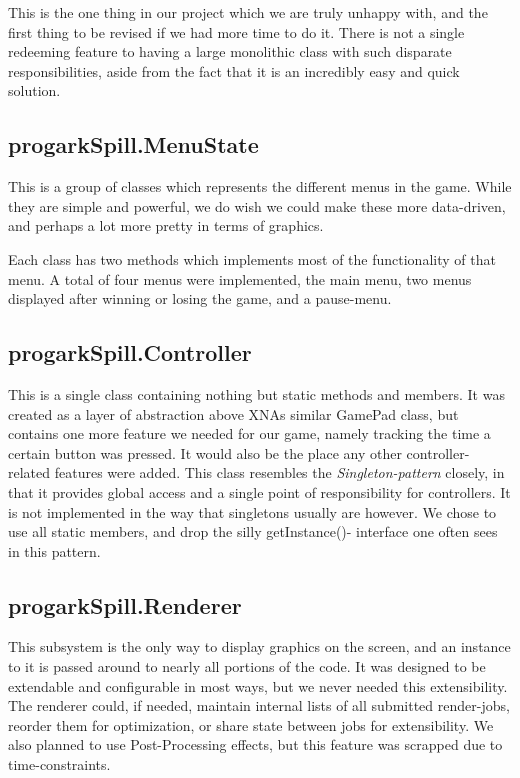 This is the one thing in our project which we are truly unhappy with, and the
first thing to be revised if we had more time to do it. There is not a single
redeeming feature to having a large monolithic class with such disparate
responsibilities, aside from the fact that it is an incredibly easy and quick
solution.

\subsection{progarkSpill.MenuState}
This is a group of classes which represents the different menus in the game.
While they are simple and powerful, we do wish we could make these more
data-driven, and perhaps a lot more pretty in terms of graphics.

Each class has two methods which implements most of the functionality of that
menu. A total of four menus were implemented, the main menu, two menus 
displayed  after winning or losing the game, and a pause-menu.

\subsection{progarkSpill.Controller}
This is a single class containing nothing but static methods and members. It
was created as a layer of abstraction above XNAs similar GamePad class, but
contains one more feature we needed for our game, namely tracking the time a
certain button was pressed. It would also be the place any other controller-
related features were added. This class resembles the \emph{Singleton-pattern}
closely, in that it provides global access and a single point of responsibility
for controllers. It is not implemented in the way that singletons usually are
however. We chose to use all static members, and drop the silly getInstance()-
interface one often sees in this pattern.

\subsection{progarkSpill.Renderer}
This subsystem is the only way to display graphics on the screen, and an
instance to it is passed around to nearly all portions of the code. It was
designed to be extendable and configurable in most ways, but we never needed
this extensibility. The renderer could, if needed, maintain internal lists of
all submitted render-jobs, reorder them for optimization, or share state 
between jobs for extensibility. We also planned to use Post-Processing effects,
but this feature was scrapped due to time-constraints.

